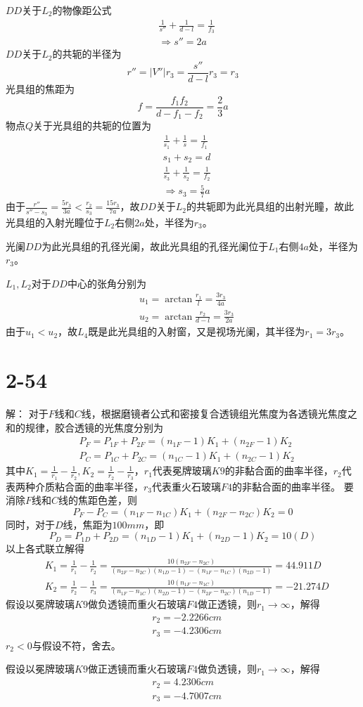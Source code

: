 \documentclass[10pt,a4paper]{article}
\theoremstyle{remark}
\begin{document}
\noindent $DD$关于$L_2$的物像距公式
\begin{align*}
&\frac{1}{s''} + \frac{1}{d - l} = \frac{1}{f_3}\\
&\Longrightarrow s'' = 2a
\end{align*}
$DD$关于$L_2$的共轭的半径为
\[
r'' = |V''|r_3 = \frac{s''}{d - l}r_3 = r_3
\]
光具组的焦距为
\[
f = \frac{f_1f_2}{d - f_1 - f_2} = \frac{2}{3}a
\]
物点$Q$关于光具组的共轭的位置为
\begin{align*}
&\frac{1}{s_1} + \frac{1}{s} = \frac{1}{f_1}\\
&s_1 + s_2 = d\\
&\frac{1}{s_3} + \frac{1}{s_2} = \frac{1}{f_2}\\
&\Longrightarrow s_3 = \frac{5}{7}a
\end{align*}
由于$\frac{r''}{s'' - s_3} = \frac{5r_3}{3a} < \frac{r_2}{s_3} = \frac{15r_3}{7a}$，故$DD$关于$L_2$的共轭即为此光具组的出射光瞳，故此光具组的入射光瞳位于$L_2$右侧$2a$处，半径为$r_3$。

\noindent 光阑$DD$为此光具组的孔径光阑，故此光具组的孔径光阑位于$L_1$右侧$4a$处，半径为$r_3$。

\noindent $L_1,L_2$对于$DD$中心的张角分别为
\begin{align*}
&u_1 = \arctan\frac{r_1}{l} = \frac{3r_3}{4a}\\
&u_2 = \arctan\frac{r_2}{d - l} = \frac{3r_3}{2a}
\end{align*}
由于$u_1 < u_2$，故$L_4$既是此光具组的入射窗，又是视场光阑，其半径为$r_1 = 3r_3$。
\section*{2-54}解：
对于$F$线和$C$线，根据磨镜者公式和密接复合透镜组光焦度为各透镜光焦度之和的规律，胶合透镜的光焦度分别为
\begin{align*}
&P_F = P_{1F} + P_{2F} = (n_{1F} - 1)K_1 + (n_{2F} - 1)K_2\\
&P_C = P_{1C} + P_{2C} = (n_{1C} - 1)K_1 + (n_{2C} - 1)K_2
\end{align*}
其中$K_1 = \frac{1}{r_1} - \frac{1}{r_2}, K_2 = \frac{1}{r_2} - \frac{1}{r_3}$，$r_1$代表冕牌玻璃$K9$的非黏合面的曲率半径，$r_2$代表两种介质粘合面的曲率半径，$r_3$代表重火石玻璃$F4$的非黏合面的曲率半径。
要消除$F$线和$C$线的焦距色差，则
\[
P_F - P_C = (n_{1F} - n_{1C})K_1 + (n_{2F} - n_{2C})K_2 = 0
\]
同时，对于$D$线，焦距为$100mm$，即
\[
P_D = P_{1D} + P_{2D} = (n_{1D} - 1)K_1 + (n_{2D} - 1)K_2 = 10(D)
\]
以上各式联立解得
\begin{align*}
&K_1 = \frac{1}{r_1} - \frac{1}{r_2} = \frac{10(n_{2F} - n_{2C})}{(n_{2F} - n_{2C})(n_{1D} - 1) - (n_{1F} - n_{1C})(n_{2D} - 1)} = 44.911D\\
&K_2 = \frac{1}{r_2} - \frac{1}{r_3} = \frac{10(n_{1F} - n_{1C})}{(n_{1F} - n_{1C})(n_{2D} - 1) - (n_{2F} - n_{2C})(n_{1D} - 1)} = -21.274D
\end{align*}
假设以冕牌玻璃$K9$做负透镜而重火石玻璃$F4$做正透镜，则$r_1 \to \infty$，解得
\begin{align*}
&r_2 = -2.2266cm\\
&r_3 = -4.2306cm
\end{align*}
$r_2 < 0$与假设不符，舍去。

\noindent 假设以冕牌玻璃$K9$做正透镜而重火石玻璃$F4$做负透镜，则$r_1 \to \infty$，解得
\begin{align*}
&r_2 = 4.2306cm\\
&r_3 = -4.7007cm
\end{align*}
\end{document}
